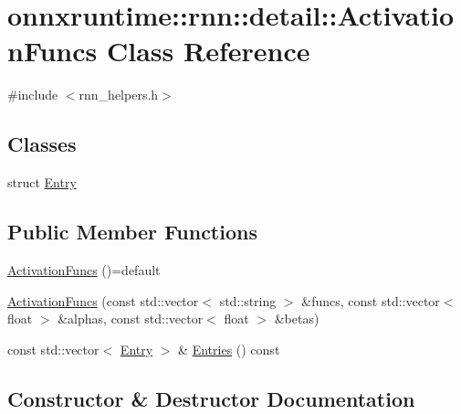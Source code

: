 \hypertarget{classonnxruntime_1_1rnn_1_1detail_1_1ActivationFuncs}{}\section{onnxruntime\+:\+:rnn\+:\+:detail\+:\+:Activation\+Funcs Class Reference}
\label{classonnxruntime_1_1rnn_1_1detail_1_1ActivationFuncs}


{\ttfamily \#include $<$rnn\+\_\+helpers.\+h$>$}

\subsection*{Classes}
\begin{DoxyCompactItemize}
\item 
struct \mbox{\hyperlink{structonnxruntime_1_1rnn_1_1detail_1_1ActivationFuncs_1_1Entry}{Entry}}
\end{DoxyCompactItemize}
\subsection*{Public Member Functions}
\begin{DoxyCompactItemize}
\item 
\mbox{\hyperlink{classonnxruntime_1_1rnn_1_1detail_1_1ActivationFuncs_ad6498706d5d6739ca3163f313fba59e2}{Activation\+Funcs}} ()=default
\item 
\mbox{\hyperlink{classonnxruntime_1_1rnn_1_1detail_1_1ActivationFuncs_aa49e05e7eabe9da56ef58334cbc2b685}{Activation\+Funcs}} (const std\+::vector$<$ std\+::string $>$ \&funcs, const std\+::vector$<$ float $>$ \&alphas, const std\+::vector$<$ float $>$ \&betas)
\item 
const std\+::vector$<$ \mbox{\hyperlink{structonnxruntime_1_1rnn_1_1detail_1_1ActivationFuncs_1_1Entry}{Entry}} $>$ \& \mbox{\hyperlink{classonnxruntime_1_1rnn_1_1detail_1_1ActivationFuncs_a6b452924f5ab661bddd1d531926e6d61}{Entries}} () const
\end{DoxyCompactItemize}


\subsection{Constructor \& Destructor Documentation}
\mbox{\label{classonnxruntime_1_1rnn_1_1detail_1_1ActivationFuncs_ad6498706d5d6739ca3163f313fba59e2}} 

